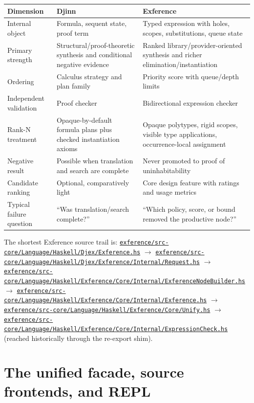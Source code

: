 \documentclass[10pt,letterpaper,oneside]{report}
\newcommand{\code}[1]{\texttt{\detokenize{#1}}}
\def\DjexBase{https://github.com/VladimirReshetnikov/Djex/blob/d3d9662598460316bdcd177ce6768c521e764aa8/}
\newcommand{\dpath}[1]{\href{\DjexBase#1}{\nolinkurl{#1}}}
\begin{document}
\begin{longtable}{@{}L{0.19\textwidth}L{0.36\textwidth}L{0.36\textwidth}@{}}
\toprule
\textbf{Dimension} & \textbf{Djinn} & \textbf{Exference} \\
\midrule
\endhead
Internal object & Formula, sequent state, proof term & Typed expression with holes, scopes, substitutions, queue state \\
Primary strength & Structural/proof-theoretic synthesis and conditional negative evidence & Ranked library/provider-oriented synthesis and richer elimination/instantiation \\
Ordering & Calculus strategy and plan family & Priority score with queue/depth limits \\
Independent validation & Proof checker & Bidirectional expression checker \\
Rank-N treatment & Opaque-by-default formula plans plus checked instantiation axioms & Opaque polytypes, rigid scopes, visible type applications, occurrence-local assignment \\
Negative result & Possible when translation and search are complete & Never promoted to proof of uninhabitability \\
Candidate ranking & Optional, comparatively light & Core design feature with ratings and usage metrics \\
Typical failure question & ``Was translation/search complete?'' & ``Which policy, score, or bound removed the productive node?'' \\
\bottomrule
\end{longtable}

\begin{sourcebox}
The shortest Exference source trail is: \dpath{exference/src-core/Language/Haskell/Djex/Exference.hs} $\rightarrow$ \dpath{exference/src-core/Language/Haskell/Djex/Exference/Internal/Request.hs} $\rightarrow$ \dpath{exference/src-core/Language/Haskell/Exference/Core/Internal/ExferenceNodeBuilder.hs} $\rightarrow$ \dpath{exference/src-core/Language/Haskell/Exference/Core/Internal/Exference.hs} $\rightarrow$ \dpath{exference/src-core/Language/Haskell/Exference/Core/Unify.hs} $\rightarrow$ \dpath{exference/src-core/Language/Haskell/Exference/Core/Internal/ExpressionCheck.hs} (reached historically through the \code{Core.ExpressionCheck} re-export shim).
\end{sourcebox}

\chapter{The unified facade, source frontends, and REPL}\label{ch:djex-facade}
\end{document}
